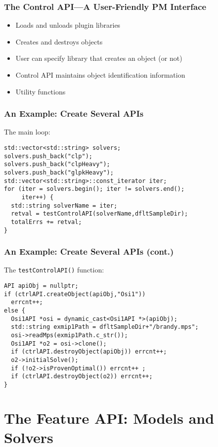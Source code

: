 \documentclass{beamer}
\begin{document}
\begin{frame}
  \frametitle{The Control API---A User-Friendly PM Interface}

  \begin{itemize}
  \item Loads and unloads plugin libraries
  \item Creates and destroys objects
  \item User can specify library that creates an object (or not)
  \item Control API maintains object identification information
  \item Utility functions
  \end{itemize}
\end{frame}

\begin{frame}[fragile]
  \frametitle{An Example: Create Several APIs}

  The main loop:
  \small
\begin{lstlisting}
std::vector<std::string> solvers;
solvers.push_back("clp");
solvers.push_back("clpHeavy");
solvers.push_back("glpkHeavy");
std::vector<std::string>::const_iterator iter;
for (iter = solvers.begin(); iter != solvers.end(); 
     iter++) {
  std::string solverName = iter;
  retval = testControlAPI(solverName,dfltSampleDir);
  totalErrs += retval;
}
\end{lstlisting}
\end{frame}

\begin{frame}[fragile]
  \frametitle{An Example: Create Several APIs (cont.)}

  The \lstinline|testControlAPI()| function:
  \small
\begin{lstlisting}
API apiObj = nullptr;
if (ctrlAPI.createObject(apiObj,"Osi1"))
  errcnt++;
else {
  Osi1API *osi = dynamic_cast<Osi1API *>(apiObj);
  std::string exmip1Path = dfltSampleDir+"/brandy.mps";
  osi->readMps(exmip1Path.c_str());
  Osi1API *o2 = osi->clone();
  if (ctrlAPI.destroyObject(apiObj)) errcnt++;
  o2->initialSolve();
  if (!o2->isProvenOptimal()) errcnt++ ;
  if (ctrlAPI.destroyObject(o2)) errcnt++;
}
\end{lstlisting}
\end{frame}

\section{The Feature API: Models and Solvers}
\end{document}
